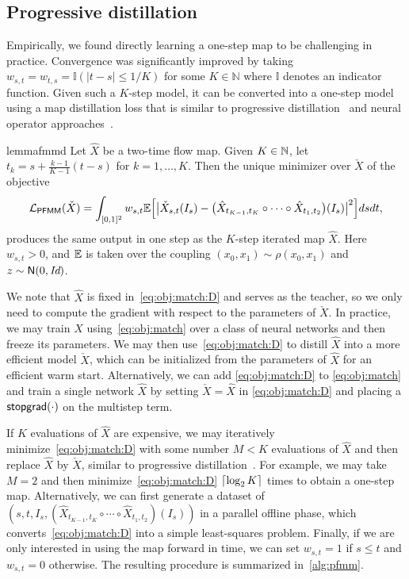 \subsection{Progressive distillation}
\label{sec:progress}

Empirically, we found directly learning a one-step map to be challenging in practice.
%
Convergence was significantly improved  by taking $w_{s,t} = w_{t,s} = \mathbb{I}\left(|t-s| \leq 1/K\right)$ for some $K \in \mathbb{N}$ where $\mathbb{I}$ denotes an indicator function.
Given such a $K$-step model, it can be converted into a one-step model using a map distillation loss that is similar to progressive distillation~\citep{salimans_progressive_2022} and neural operator approaches~\citep{zheng_fast_2023}.


\begin{restatable}{lemma}{fmmd}
	\label{prop:fmmd}
	Let $\hat X$ be a two-time flow map. Given $K\in \mathbb{N}$, let $t_k = s + \frac{k-1}{K-1}(t-s)$ for $k=1, \ldots, K$. Then the unique minimizer over $\check X$ of the objective
	\begin{align}
		\label{eq:obj:match:D}
		\mathcal{L}_{\mathsf{PFMM}}(\check X) = \int_{[0,1]^2} w_{s,t}  \mathbb{E} \Big[\big| \check X_{s,t} (I_s) - \big(\hat{X}_{t_{K-1}, t_K}\circ \cdots \circ \hat{X}_{t_1, t_2}\big)(I_s)\big|^2\Big] ds dt,
	\end{align}
	produces the same output in one step as the $K$-step iterated map $\hat X$. Here $w_{s,t}> 0$, and $\mathbb{E}$ is taken over the coupling $(x_0, x_1) \sim \rho(x_0, x_1)$ and $z \sim \mathsf N(0, \text{\it Id})$.
\end{restatable}
%
We note that $\hat X$ is fixed in~\eqref{eq:obj:match:D} and serves as the teacher, so we only need to compute the gradient with respect to the parameters of $\check X$.
%
In practice, we may train $\hat{X}$ using~\eqref{eq:obj:match} over a class of neural networks and then freeze its parameters.
%
We may then use~\eqref{eq:obj:match:D} to distill $\hat{X}$ into a more efficient model $\check{X}$, which can be initialized from the parameters of $\hat{X}$ for an efficient warm start.
%
Alternatively, we can add \eqref{eq:obj:match:D} to \eqref{eq:obj:match} and train a single network $\hat X$ by setting $\check X = \hat X$ in \eqref{eq:obj:match:D} and placing a $\mathsf{stopgrad}(\cdot)$ on the multistep term.

If $K$ evaluations of $\hat{X}$ are expensive, we may iteratively minimize~\eqref{eq:obj:match:D} with some number $M < K$ evaluations of $\hat{X}$ and then replace $\hat{X}$ by $\check{X}$, similar to progressive distillation~\citep{salimans_progressive_2022}.
%
For example, we may take $M = 2$ and then minimize~\eqref{eq:obj:match:D} $\lceil \log_2 K \rceil$ times to obtain a one-step map.
%
Alternatively, we can first generate a dataset of $(s, t, I_s, (\hat{X}_{t_{K-1}, t_K}\circ \cdots \circ \hat{X}_{t_1, t_2})(I_s))$ in a parallel offline phase, which converts~\eqref{eq:obj:match:D} into a simple least-squares problem.
% 
Finally, if we are only interested in using the map forward in time, we can set $w_{s,t}=1$ if $s\le t$ and $w_{s,t}=0$ otherwise.
%
The resulting procedure is summarized in~\cref{alg:pfmm}.
